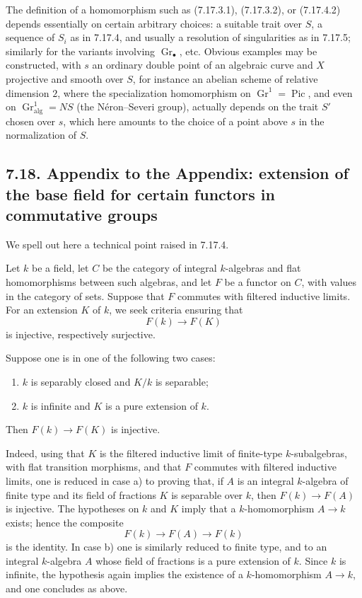 \documentclass[11pt]{article}
\newcommand{\Gr}{\operatorname{Gr}}
\providecommand{\Pic}{\operatorname{Pic}}
\providecommand{\Gr}{\operatorname{Gr}}
\providecommand{\Gr}{\operatorname{G}}
\begin{document}
The definition of a homomorphism such as (7.17.3.1), (7.17.3.2), or (7.17.4.2) depends essentially on certain arbitrary choices: a suitable trait over \(S\), a sequence of \(S_i\) as in 7.17.4, and usually a resolution of singularities as in 7.17.5; similarly for the variants involving \(\Gr_\bullet\), etc. Obvious examples may be constructed, with \(s\) an ordinary double point of an algebraic curve and \(X\) projective and smooth over \(S\), for instance an abelian scheme of relative dimension \(2\), where the specialization homomorphism on \(\Gr^1=\Pic\), and even on \(\Gr^1_{\mathrm{alg}}=NS\) (the Néron--Severi group), actually depends on the trait \(S'\) chosen over \(s\), which here amounts to the choice of a point above \(s\) in the normalization of \(S\).

\subsection*{7.18. Appendix to the Appendix: extension of the base field for certain functors in commutative groups}
We spell out here a technical point raised in 7.17.4.

Let \(k\) be a field, let \(C\) be the category of integral \(k\)-algebras and flat homomorphisms between such algebras, and let \(F\) be a functor on \(C\), with values in the category of sets. Suppose that \(F\) commutes with filtered inductive limits. For an extension \(K\) of \(k\), we seek criteria ensuring that
\[
  F(k)\longrightarrow F(K)
\]
is injective, respectively surjective.

Suppose one is in one of the following two cases:
\begin{enumerate}[label=\alph*)]
\item \(k\) is separably closed and \(K/k\) is separable;
\item \(k\) is infinite and \(K\) is a pure extension of \(k\).
\end{enumerate}
Then \(F(k)\to F(K)\) is injective.

Indeed, using that \(K\) is the filtered inductive limit of finite-type \(k\)-subalgebras, with flat transition morphisms, and that \(F\) commutes with filtered inductive limits, one is reduced in case a) to proving that, if \(A\) is an integral \(k\)-algebra of finite type and its field of fractions \(K\) is separable over \(k\), then \(F(k)\to F(A)\) is injective. The hypotheses on \(k\) and \(K\) imply that a \(k\)-homomorphism \(A\to k\) exists; hence the composite
\[
  F(k)\longrightarrow F(A)\longrightarrow F(k)
\]
is the identity. In case b) one is similarly reduced to finite type, and to an integral \(k\)-algebra \(A\) whose field of fractions is a pure extension of \(k\). Since \(k\) is infinite, the hypothesis again implies the existence of a \(k\)-homomorphism \(A\to k\), and one concludes as above.
\end{document}
